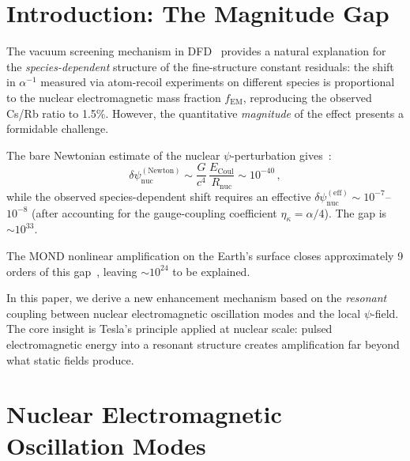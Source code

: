 \documentclass[aps,prd,twocolumn,superscriptaddress,nofootinbib]{revtex4-2}
\newcommand{\kap}{\kappa}
\newcommand{\fEM}{f_{\mathrm{EM}}}
\newcommand{\ainv}{\alpha^{-1}}
\newcommand{\dpsi}{\delta\psi}
\newcommand{\Rnuc}{R_{\mathrm{nuc}}}
\newcommand{\Ecoul}{E_{\mathrm{Coul}}}
\begin{document}
\section{Introduction: The Magnitude Gap}
\label{sec:intro}

The vacuum screening mechanism in DFD~\cite{Alcock2026VS} provides a
natural explanation for the \emph{species-dependent} structure of the
fine-structure constant residuals: the shift in $\ainv$ measured via
atom-recoil experiments on different species is proportional to the
nuclear electromagnetic mass fraction $\fEM$, reproducing the observed
Cs/Rb ratio to 1.5\%.  However, the quantitative \emph{magnitude}
of the effect presents a formidable challenge.

The bare Newtonian estimate of the nuclear $\psi$-perturbation
gives~\cite{Alcock2026VS}:
\begin{equation}\label{eq:dpsi-newton}
\dpsi_{\mathrm{nuc}}^{(\mathrm{Newton})} \sim
\frac{G}{c^4}\,\frac{\Ecoul}{\Rnuc} \sim 10^{-40}\,,
\end{equation}
while the observed species-dependent shift requires an effective
$\dpsi_{\mathrm{nuc}}^{(\mathrm{eff})} \sim 10^{-7}$--$10^{-8}$
(after accounting for the gauge-coupling coefficient $\eta_\kap
= \alpha/4$).  The gap is $\sim\!10^{33}$.

The MOND nonlinear amplification on the Earth's surface closes
approximately 9 orders of this gap~\cite{Alcock2026VS}, leaving
$\sim\!10^{24}$ to be explained.

In this paper, we derive a new enhancement mechanism based on the
\emph{resonant} coupling between nuclear electromagnetic oscillation
modes and the local $\psi$-field.  The core insight is Tesla's
principle applied at nuclear scale: pulsed electromagnetic energy
into a resonant structure creates amplification far beyond what
static fields produce.


\section{Nuclear Electromagnetic Oscillation Modes}
\label{sec:gdr}
\end{document}
